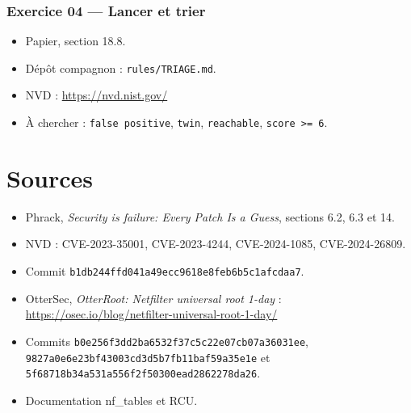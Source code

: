 \documentclass{training}
\begin{document}
\subsection*{Exercice 04 --- Lancer et trier}
\begin{itemize}
  \item Papier, section 18.8.
  \item Dépôt compagnon : \texttt{rules/TRIAGE.md}.
  \item NVD : \url{https://nvd.nist.gov/}
  \item À chercher : \texttt{false positive}, \texttt{twin},
        \texttt{reachable}, \texttt{score >= 6}.
\end{itemize}

\chapter{Sources}
\begin{itemize}
  \item Phrack, \emph{Security is failure: Every Patch Is a Guess},
        sections 6.2, 6.3 et 14.
  \item NVD : CVE-2023-35001, CVE-2023-4244, CVE-2024-1085,
        CVE-2024-26809.
  \item Commit \texttt{b1db244ffd041a49ecc9618e8feb6b5c1afcdaa7}.
  \item OtterSec, \emph{OtterRoot: Netfilter universal root 1-day} :
        \url{https://osec.io/blog/netfilter-universal-root-1-day/}
  \item Commits \texttt{b0e256f3dd2ba6532f37c5c22e07cb07a36031ee},
        \texttt{9827a0e6e23bf43003cd3d5b7fb11baf59a35e1e} et
        \texttt{5f68718b34a531a556f2f50300ead2862278da26}.
  \item Documentation nf\_tables et RCU.
\end{itemize}

\end{document}
